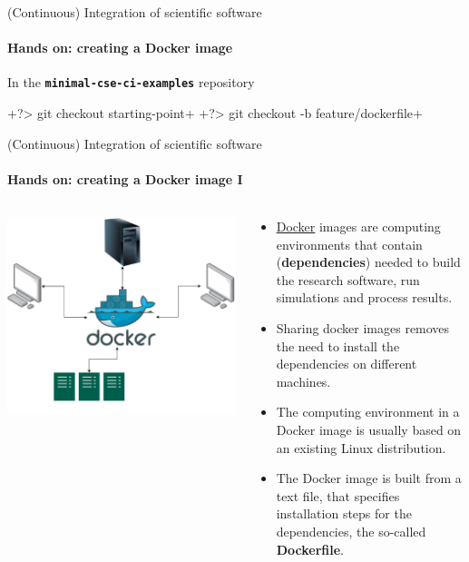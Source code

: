 \begin{frame}{(Continuous) Integration of scientific software} 
    \framesubtitle{Hands on: creating a Docker image} 

    \vfill

    In the \textbf{\texttt{minimal-cse-ci-examples}} repository


    +?> git checkout starting-point+
    +?> git checkout -b feature/dockerfile+

\end{frame}

\begin{frame}{(Continuous) Integration of scientific software} 
    \framesubtitle{Hands on: creating a Docker image I} 
    \vfill

    \begin{columns}
        \begin{column}[c]{0.5\textwidth}
            \centering
            \includegraphics[width=0.8\columnwidth]{figures/docker-description.pdf}
        \end{column}
        \begin{column}[c]{0.5\textwidth}

            \begin{itemize}
                \item \href{https://docs.docker.com/}{Docker} images are computing environments that contain (\textbf{dependencies}) needed to build the research software, run simulations and process results. 
                \item Sharing docker images removes the need to install the dependencies on different machines. 
                \item The computing environment in a Docker image is usually based on an existing Linux distribution. 
                \item The Docker image is built from a text file, that specifies installation steps for the dependencies, the so-called \textbf{Dockerfile}.
            \end{itemize}
        \end{column}
    \end{columns}
\end{frame}

